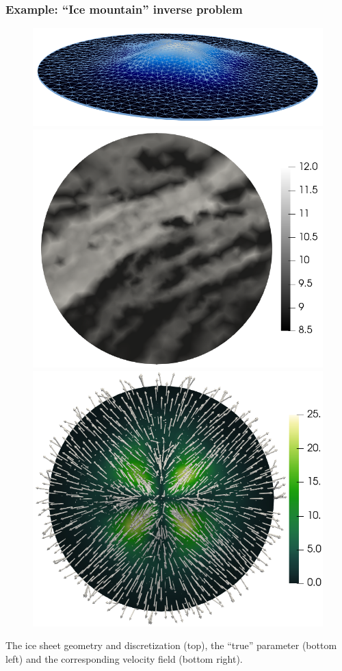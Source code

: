 \documentclass[10pt,final,xcolor=dvipsnames,aspect ratio=169]{beamer}
\begin{document}
\begin{frame}
	\frametitle{Example: ``Ice mountain'' inverse problem}
	
	\begin{figure}
		\centering\includegraphics[scale=0.22]{figures/meshHeight_view2_edges.png}\\
		\includegraphics[scale=0.18]{figures/mtrue_withColorBar.png}
		\includegraphics[scale=0.18]{figures/trueVelocity2_glyphs.png}
	\end{figure}
	\begin{center}
		The ice sheet geometry and discretization (top), the ``true''
		parameter (bottom left) and the corresponding velocity field
		(bottom right).
	\end{center}
\end{frame}
\end{document}
